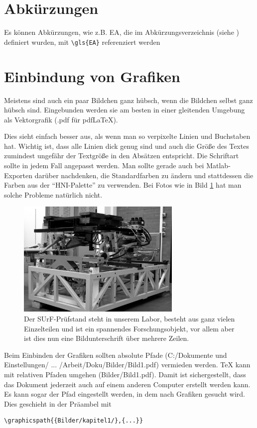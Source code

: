 \section{Abkürzungen}
Es können Abkürzungen, wie z.B. \gls{EA}, die im Abkürzungsverzeichnis (siehe ) definiert wurden, mit \lstinline|\gls{EA}| referenziert werden 
\section{Einbindung von Grafiken}
Meistens sind auch ein paar Bildchen ganz hübsch, wenn die Bildchen selbst ganz hübsch sind. Eingebunden werden sie am besten in einer gleitenden Umgebung als Vektorgrafik (.pdf für pdfLaTeX).

Dies sieht einfach besser aus, als wenn man so verpixelte Linien und Buchstaben hat. Wichtig ist, dass alle Linien dick genug sind und auch die Größe des Textes zumindest ungefähr der Textgröße in den Absätzen entspricht. Die Schriftart sollte in jedem Fall angepasst werden. Man sollte gerade auch bei Matlab-Exporten darüber nachdenken, die Standardfarben zu ändern und stattdessen die Farben aus der "`HNI-Palette"' zu verwenden. Bei Fotos wie in Bild \ref{fig:surf} hat man solche Probleme natürlich nicht.
\begin{figure}[htb]
	\centering
	\includegraphics[width=0.7\textwidth]{Bilder/kapitel1/Pruefstand_Foto}
	\caption{Der SUrF-Prüfstand steht in unserem Labor, besteht aus ganz vielen Einzelteilen und ist ein spannendes Forschungsobjekt, vor allem aber ist dies nun eine Bildunterschrift über mehrere Zeilen.}
	\label{fig:surf}
\end{figure}

Beim Einbinden der Grafiken sollten absolute Pfade (C:/Dokumente und Einstellungen/ ... /Arbeit/Doku/Bilder/Bild1.pdf) vermieden werden. TeX kann mit relativen Pfaden umgehen (Bilder/Bild1.pdf). Damit ist sichergestellt, dass das Dokument jederzeit auch auf einem anderen Computer erstellt werden kann. Es kann sogar der Pfad eingestellt werden, in dem nach Grafiken gesucht wird. Dies geschieht in der Präambel mit \begin{lstlisting}[style=myLatexStyle]
	\graphicspath{{Bilder/kapitel1/},{...}}
\end{lstlisting}


